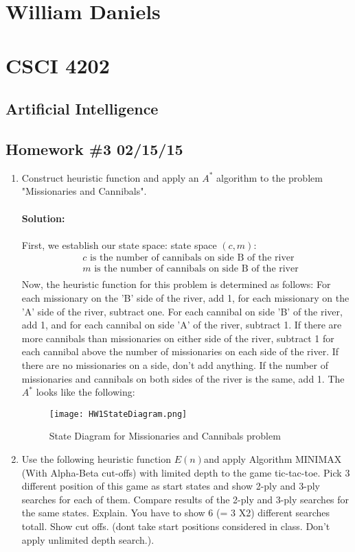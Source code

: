 \documentclass[11pt]{article}
\begin{document}
\begin{center}
\section*{William Daniels}
\section*{CSCI 4202}
\subsection*{Artificial Intelligence}
\subsection*{Homework \#3 02/15/15}
\end{center}

\vspace{.25cm}
\begin{enumerate}
\item Construct heuristic function and apply an $A^*$ algorithm to the problem "Missionaries and Cannibals".\\\\
\textbf{Solution:}\\\\
First, we establish our state space: 
state space $(c, m)$:
\begin{align*}
&c\text{ is the number of cannibals on side B of the river}\\
&m \text{ is the number of cannibals on side B of the river}\\
\end{align*}
Now, the heuristic function for this problem is determined as follows: For each missionary on the 'B' side of the river, add 1, for each missionary on the 'A' side of the river, subtract one. For each cannibal on side 'B' of the river, add 1, and for each cannibal on side 'A' of the river, subtract 1. If there are more cannibals than missionaries on either side of the river, subtract 1 for each cannibal above the number of missionaries on each side of the river. If there are no missionaries on a side, don't add anything. If the number of missionaries and cannibals on both sides of the river is the same, add 1. 
The $A^*$  looks like the following: 
\begin{figure}[ht!]
\centering
\texttt{[image: HW1StateDiagram.png]}
\caption{State Diagram for Missionaries and Cannibals problem \label{overflow}}
\end{figure}


\item Use the following heuristic function $E(n)$and apply Algorithm MINIMAX (With Alpha-Beta cut-offs) with limited depth to the game tic-tac-toe. Pick 3 different position of this game as start states and show 2-ply and 3-ply searches for each of them. Compare results of the 2-ply and 3-ply searches for the same states. Explain. You have to show 6 (= 3 X2) different searches totall. Show cut offs. (dont take start positions considered in class. Don't apply unlimited depth search.). 
\end{enumerate}
\end{document}
